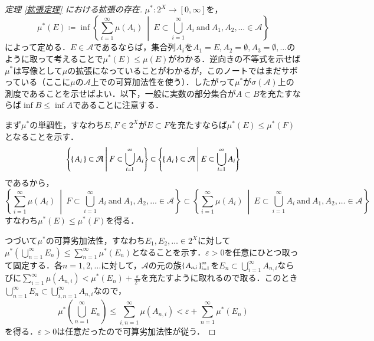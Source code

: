 \begin{proof}[定理 \ref{拡張定理} における拡張の存在]$\mu^* \colon 2^X \to [0,\infty]$を，
\begin{equation}
\mu^*(E) \coloneqq \inf \left\{ \sum_{i=1}^\infty \mu(A_i) \ \middle| \ E \subset \bigcup_{i=1}^\infty A_i \ \text{and} \ A_1,A_2, \dots \in \mathcal{A} \right\}
\end{equation}によって定める．$E \in \mathcal{A}$であるならば，集合列$A_i$を$A_1 = E, A_2 = \emptyset, A_3 = \emptyset, \dots$のように取って考えることで$\mu^*(E) \leq \mu(E)$がわかる．逆向きの不等式を示せば$\mu^*$は写像として$\mu$の拡張になっていることがわかるが，このノートではまだサボっている（ここに$\mu$の$\mathcal{A}$上での可算加法性を使う）．したがって$\mu^*$が$\sigma(\mathcal{A})$上の測度であることを示せばよい．以下，一般に実数の部分集合が$A \subset B$を充たすならば$\inf B \leq \inf A$であることに注意する．

まず$\mu^*$の単調性，すなわち$E, F \in 2^X$が$E \subset F$を充たすならば$\mu^*(E) \leq \mu^*(F)$となることを示す．
\begin{equation}
\left\{ \set{A_i} \subset \mathcal{A}  \ \middle| \ F \subset \bigcup_{i=1}^\infty A_i \right\}
\subset
\left\{ \set{A_i}  \subset \mathcal{A} \ \middle| \ E \subset \bigcup_{i=1}^\infty A_i \right\}
\end{equation}であるから，
\begin{equation}
\left\{ \sum_{i=1}^\infty \mu(A_i) \ \middle| \ F \subset \bigcup_{i=1}^\infty A_i \ \text{and} \ A_1,A_2, \dotsc \in \mathcal{A} \right\}
\subset
\left\{ \sum_{i=1}^\infty \mu(A_i) \ \middle| \ E \subset \bigcup_{i=1}^\infty A_i \ \text{and} \ A_1,A_2, \dotsc \in \mathcal{A} \right\}
\end{equation}すなわち$\mu^*(E) \leq \mu^*(F)$を得る．

つづいて$\mu^*$の可算劣加法性，すなわち$E_1, E_2, \dots \in 2^X$に対して$\mu^* \left( \bigcup_{n=1}^\infty E_n \right) \leq \sum_{n=1}^\infty \mu^*(E_n)$となることを示す．$\varepsilon > 0$を任意にひとつ取って固定する．各$n =1,2,\dots$に対して，$\mathcal{A}$の元の族$\set{A_{n,i}}_{i=1}^\infty$を$E_n \subset \bigcup_{i=1}^\infty A_{n,i}$ならびに$\sum_{i=1}^\infty \mu(A_{n,i}) < \mu^*(E_n) + \frac{\varepsilon}{2^n}$を充たすように取れるので取る．このとき$\bigcup_{n=1}^\infty E_n \subset \bigcup_{i,n=1}^\infty A_{n,i}$なので，
\begin{equation}
\mu^*\left(\bigcup_{n=1}^\infty E_n \right) \leq \sum_{i,n=1}^\infty \mu(A_{n,i}) <  \varepsilon + \sum_{n=1}^\infty \mu^*(E_n) 
\end{equation}を得る．$\varepsilon > 0$は任意だったので可算劣加法性が従う．


\end{proof}

